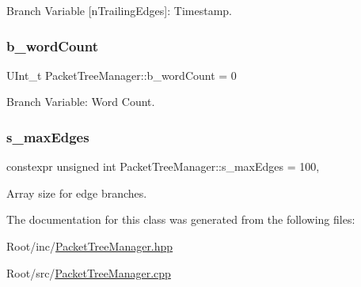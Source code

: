 Branch Variable \mbox{[}n\+Trailing\+Edges\mbox{]}\+: Timestamp. 

\mbox{\label{class_packet_tree_manager_ad7d8e0343e3e5f949dc20e591b2e6b2b}} 
\subsubsection{\texorpdfstring{b\+\_\+word\+Count}{b\_wordCount}}
{\footnotesize\ttfamily U\+Int\+\_\+t Packet\+Tree\+Manager\+::b\+\_\+word\+Count = 0\hspace{0.3cm}{\ttfamily [private]}}



Branch Variable\+: Word Count. 

\mbox{\label{class_packet_tree_manager_a4ba06517ad1cb912ff70df1ff69231a5}} 
\subsubsection{\texorpdfstring{s\+\_\+max\+Edges}{s\_maxEdges}}
{\footnotesize\ttfamily constexpr unsigned int Packet\+Tree\+Manager\+::s\+\_\+max\+Edges = 100\hspace{0.3cm}{\ttfamily [static]}, {\ttfamily [private]}}



Array size for edge branches. 



The documentation for this class was generated from the following files\+:\begin{DoxyCompactItemize}
\item 
Root/inc/\hyperlink{_packet_tree_manager_8hpp}{Packet\+Tree\+Manager.\+hpp}\item 
Root/src/\hyperlink{_packet_tree_manager_8cpp}{Packet\+Tree\+Manager.\+cpp}\end{DoxyCompactItemize}
